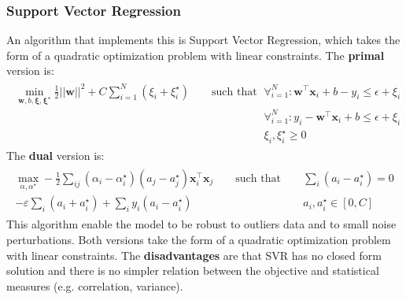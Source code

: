 \subsubsection{Support  Vector Regression}
An algorithm that implements this is Support Vector Regression, which takes the form of a quadratic optimization problem with linear constraints. The \textbf{primal} version is:
\begin{align}
	\begin{split}
		\min_{\mathbf{w},b,\mathbf{\xi},\mathbf{\xi^\star}} \frac{1}{2}  \lvert\lvert \mathbf{w}\rvert\rvert^2+C\sum_{i=1}^{N}(\xi_i + \xi_i^\star) \qquad \text{such that} \qquad & \forall_{i=1}^N : \mathbf{w}^\top \mathbf{x}_i + b - y_i \leq \epsilon + \xi_i \\
		& \forall_{i=1}^N : y_i -\mathbf{w}^\top \mathbf{x}_i + b \leq \epsilon + \xi_i \\
		& \xi_i, \xi_i^\star \geq 0
	\end{split}
\end{align}
The \textbf{dual} version is:
\begin{align}
	\begin{split}
		\max_{\alpha, \alpha^\star} -\frac{1}{2}\sum_{ij}(\alpha_i-\alpha_i^\star)(a_j - a_j^\star)\mathbf{x}_i^\top \mathbf{x}_j  \qquad \text{such that} \qquad & \sum_i(a_i - a_i^\star) = 0 \\
		- \varepsilon \sum_i(a_i +a_i^\star) +\sum_i y_i(a_i - a_i^\star)  \qquad \qquad\qquad\qquad& a_i, a_i^\star \in [0, C]
	\end{split}
\end{align}
This algorithm enable the model to be robust to outliers data and to small noise perturbations. Both versions take the form of a quadratic optimization problem with linear constraints. The \textbf{disadvantages} are that SVR has no closed form solution and there is no simpler relation between the objective and statistical measures (e.g. correlation, variance).

